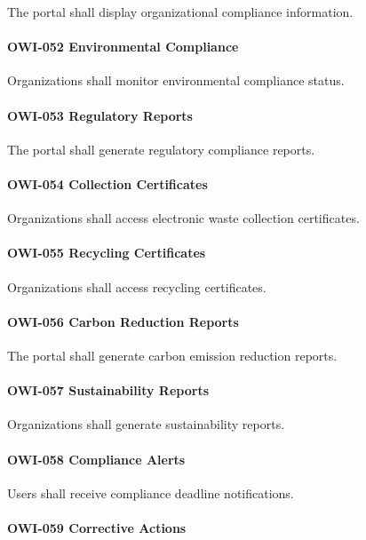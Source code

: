The portal shall display organizational compliance information.

\paragraph{OWI-052 Environmental Compliance}

Organizations shall monitor environmental compliance status.

\paragraph{OWI-053 Regulatory Reports}

The portal shall generate regulatory compliance reports.

\paragraph{OWI-054 Collection Certificates}

Organizations shall access electronic waste collection certificates.

\paragraph{OWI-055 Recycling Certificates}

Organizations shall access recycling certificates.

\paragraph{OWI-056 Carbon Reduction Reports}

The portal shall generate carbon emission reduction reports.

\paragraph{OWI-057 Sustainability Reports}

Organizations shall generate sustainability reports.

\paragraph{OWI-058 Compliance Alerts}

Users shall receive compliance deadline notifications.

\paragraph{OWI-059 Corrective Actions}

